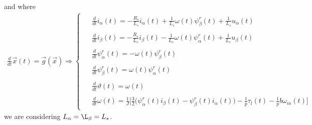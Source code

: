 \documentclass[12pt,a4paper,oneside]{book}
\begin{document}
\begin{onehalfspace}
\begin{equation}
\end{equation} 
and where
\begin{align}\label{pmsm_problem_1_eq_8}
	\frac{d}{dt}\vec{x}(t)=\vec{g}(\vec{x})\Rightarrow\left\lbrace 
	\begin{aligned}
		\begin{split}
			&\frac{d}{dt}i_\alpha(t) = -\frac{R_s}{L_s}i_\alpha(t) + 	
			\frac{1}{L_s}\omega(t)\psi_\beta^r(t) + \frac{1}{L_s} u_\alpha(t) 
		\end{split}	\\[6pt]
		\begin{split}
			&\frac{d}{dt}i_\beta(t) = -\frac{R_s}{L_s}i_\beta(t) - 	
			\frac{1}{L_s}\omega(t)\psi_\alpha^r(t) + \frac{1}{L_s} u_\beta(t)	
		\end{split}	\\[6pt]
		\begin{split}
			&\frac{d}{dt}\psi_\alpha^r(t) = -\omega(t)\psi_\beta^r(t)
		\end{split}	\\[6pt]
		\begin{split}	
			&\frac{d}{dt}\psi_\beta^r(t) = \omega(t)\psi_\alpha^r(t)	
		\end{split}	\\[6pt]
		\begin{split}
			&\frac{d}{dt}\vartheta(t) = \omega(t)
		\end{split}	\\[6pt]
		\begin{split}
			&\frac{d}{dt}\omega(t) = 
			\frac{1}{J}\Bigg[\frac{3}{2}\Big(\psi^r_{\alpha}(t)i_{\beta}(t) - 
			\psi^r_{\beta}(t)i_{\alpha}(t)\Big)  -\frac{1}{p}\tau_l(t) 
			-\frac{1}{p}b\omega_m(t)\Bigg]
		\end{split}
	\end{aligned}\right. 
\end{align}
we are considering $L_\alpha = \L_\beta = L_s$.


\end{onehalfspace}
\end{document}
